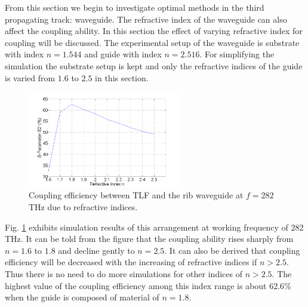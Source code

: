 From this section we begin to investigate optimal methods in the third propagating track: waveguide. The refractive index of the waveguide can also affect the coupling ability. In this section the effect of varying refractive index for coupling will be discussed. The experimental setup of the waveguide is substrate with index $n=1.544$ and guide with index $n=2.516$. For simplifying the simulation the substrate setup is kept and only the refractive indices of the guide is varied from $1.6$ to $2.5$ in this section.\\

\begin{figure}[!ht]
\centering
\includegraphics[width=0.6\textwidth]{bilder/s21_refractive_index}
\caption{Coupling efficiency between TLF and the rib waveguide at $f=282$THz due to refractive indices.}
\label{fig:refractive_index}
\end{figure}
Fig. \ref{fig:refractive_index} exhibits simulation results of this arrangement at working frequency of $282$ THz. It can be told from the figure that the coupling ability rises sharply from $n=1.6$ to $1.8$ and decline gently to $n=2.5$. It can also be derived that coupling efficiency will be decreased with the increasing of refractive indices if $n>2.5$. Thus there is no need to do more simulations for other indices of $n>2.5$. The highest value of the coupling efficiency among this index range is about $62.6\%$ when the guide is composed of material of $n=1.8$.\\


